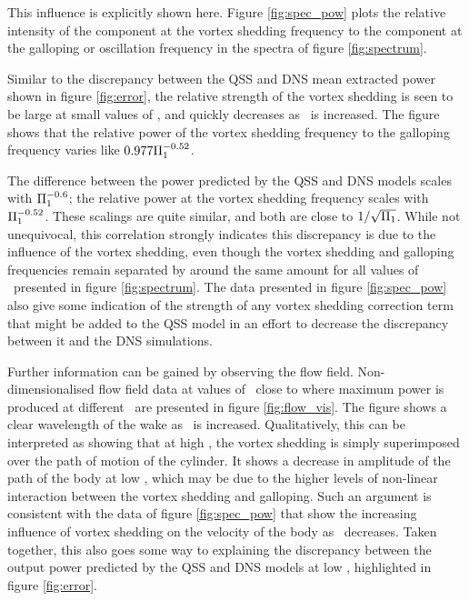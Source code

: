 This influence is explicitly shown here. Figure \ref{fig:spec_pow} plots the relative intensity of the component at the vortex shedding frequency to the component at the galloping or oscillation frequency in the spectra of figure \ref{fig:spectrum}.




Similar to the discrepancy between the QSS and DNS mean extracted power shown in figure \ref{fig:error}, the relative strength of the vortex shedding is seen to be large at small values of \massstiff, and quickly decreases as \massstiff\ is increased. The figure shows that the relative power of the vortex shedding frequency to the galloping frequency varies like $0.977\Pi_1^{-0.52}$.

The difference between the power predicted by the QSS and DNS models scales with $\Pi_1^{-0.6}$; the relative power at the vortex shedding frequency scales with $\Pi_1^{-0.52}$. These scalings are quite similar, and both are close to $1/\sqrt{\Pi_1}$. While not unequivocal, this correlation strongly indicates this discrepancy is due to the influence of the vortex shedding, even though the vortex shedding and galloping frequencies remain separated by around the same amount for all values of \massstiff\ presented in figure \ref{fig:spectrum}. The data presented in figure \ref{fig:spec_pow} also give some indication of the strength of any vortex shedding correction term that might be added to the QSS model in an effort to decrease the discrepancy between it and the DNS simulations.



Further information can be gained by observing the flow field. Non-dimensionalised flow field data at values of \massdamp\ close to where maximum power is produced at different \massstiff\ are presented in figure \ref{fig:flow_vis}. The figure shows a clear wavelength of the wake as \massstiff \ is increased. Qualitatively, this can be interpreted as showing that at high \massstiff, the vortex shedding is simply superimposed over the path of motion of the cylinder. It shows a decrease in amplitude of the path of the body at low \massstiff, which may be due to the higher levels of non-linear interaction between the vortex shedding and galloping. Such an argument is consistent with the data of figure \ref{fig:spec_pow} that show the increasing influence of vortex shedding on the velocity of the body as \massstiff\ decreases. Taken together, this also goes some way to explaining the discrepancy between the output power predicted by the QSS and DNS models at low \massstiff, highlighted in figure \ref{fig:error}.

